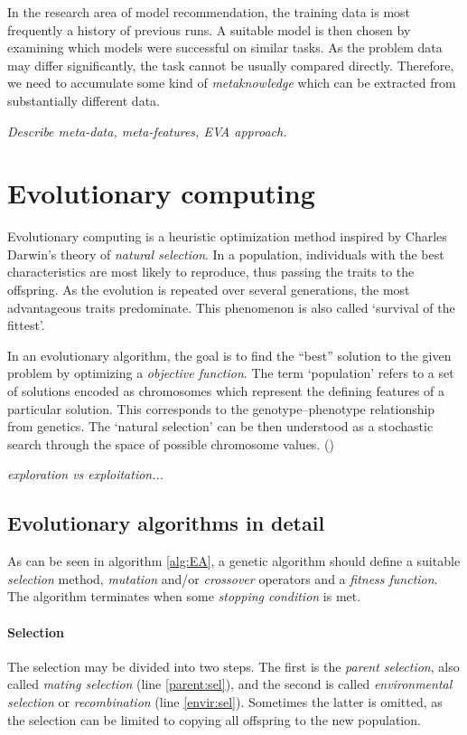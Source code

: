 In the research area of model recommendation, the training data is most
frequently a history of previous runs. A suitable model is then chosen by
examining which models were successful on similar tasks. As the problem data
may differ significantly, the task cannot be usually compared directly.
Therefore, we need to accumulate some kind of \emph{metaknowledge} which
can be extracted from substantially different data.

\textit{Describe meta-data, meta-features, EVA approach.}

\section{Evolutionary computing} \label{ea}
Evolutionary computing is a heuristic optimization method inspired by 
Charles Darwin's theory of \emph{natural selection}. \cite{darwin} In 
a population, individuals with the best characteristics are most likely
to reproduce, thus passing the traits to the offspring. As the 
evolution is repeated over several generations, the most advantageous traits 
predominate. This phenomenon is also called `survival of the fittest'.

In an evolutionary algorithm, the goal is to find the ``best'' solution 
to the given problem by optimizing a \emph{objective function}. The term
`population' refers to a set of solutions encoded as chromosomes which 
represent the defining features of a particular solution. This corresponds
to the genotype--phenotype relationship from genetics. The `natural selection'
can be then understood as a stochastic search through the space of possible 
chromosome values. 
(\cite{Engelbrecht:2007:CII:1557464})

\textit{exploration vs exploitation...}

\subsection{Evolutionary algorithms in detail}
As can be seen in algorithm \ref{alg:EA}, a genetic algorithm should 
define a suitable \emph{selection} method, \emph{mutation} and/or 
\emph{crossover} operators and a \emph{fitness function}.
The algorithm terminates when some \emph{stopping condition} is met. 

\paragraph{Selection}
The selection may be divided into two steps. The first is the 
\emph{parent selection}, also called \emph{mating selection}
(line \ref{parent:sel}), and the second is called
\emph{environmental selection} or \emph{recombination} (line \ref{envir:sel}).
Sometimes the latter is omitted, as the selection can be limited to copying 
all offspring to the new population.

